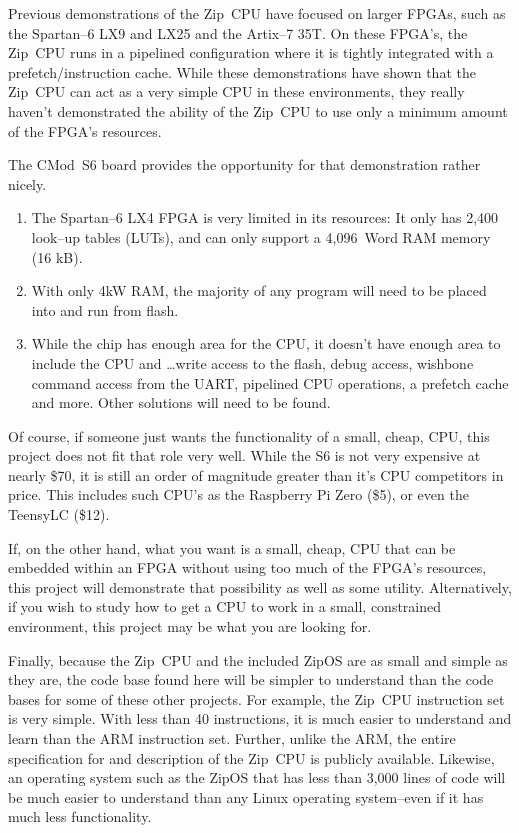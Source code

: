 \documentclass{gqtekspec}
\begin{document}
Previous demonstrations of the Zip~CPU have focused on larger FPGAs, such as
the Spartan--6 LX9 and LX25 and the Artix--7 35T.  On these FPGA's,
the Zip~CPU runs in a pipelined configuration where it is tightly integrated
with a prefetch/instruction cache.  While these demonstrations have shown that
the Zip~CPU can act as a very simple CPU in these environments, they really
haven't demonstrated the ability of the Zip~CPU to use only a minimum amount
of the FPGA's resources.

The CMod~S6 board provides the opportunity for that demonstration rather nicely.
\begin{enumerate}
\item The Spartan--6 LX4 FPGA is very limited in its resources: 
	It only has 2,400 look--up tables (LUTs), and can only support 
	a 4,096~Word RAM memory (16 kB).
\item With only 4kW RAM, the majority of any program will need to be placed into
	and run from flash. 
\item While the chip has enough area for the CPU, it doesn't have enough area
	to include the CPU and \ldots write access to the flash, debug access,
	wishbone command access from the UART, pipelined CPU operations,
	a prefetch cache and more.  Other solutions will need to be found.
\end{enumerate}

Of course, if someone just wants the functionality of a small, cheap, CPU,
this project does not fit that role very well.  While the S6 is not very
expensive at nearly \$70, it is still an order of magnitude greater than it's
CPU competitors in price.  This includes such CPU's as the Raspberry Pi Zero
(\$5), or even the TeensyLC (\$12).


If, on the other hand, what you want is a small, cheap, CPU that can be
embedded within an FPGA without using too much of the FPGA's resources, this
project will demonstrate that possibility as well as some utility. 
Alternatively, if you wish to study how to get a CPU to work in a small,
constrained environment, this project may be what you are looking for.

Finally, because the Zip~CPU and the included ZipOS are as small and simple as
they are, the code base found here will be simpler to understand than the
code bases for some of these other projects.  For example, the Zip~CPU
instruction set is very simple.  With less than 40 instructions, it is much
easier to understand and learn than the ARM instruction set.  Further, unlike
the ARM, the entire specification for and description of the Zip~CPU is
publicly available.  Likewise, an operating system such as the ZipOS that has
less than \hbox{3,000} lines of code will be much easier to understand than any
Linux operating system--even if it has much less functionality.
\end{document}

